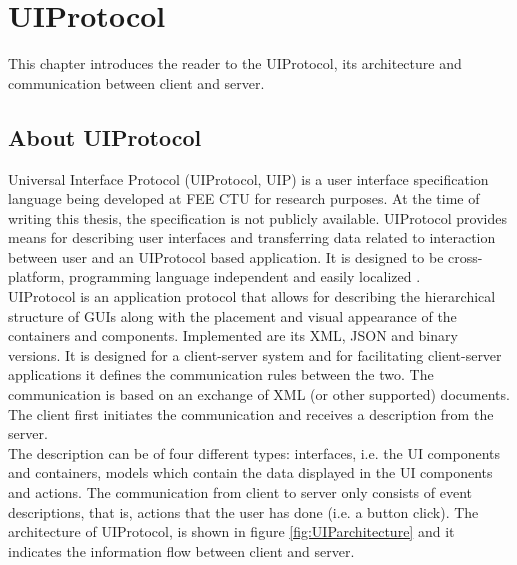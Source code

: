 \section{UIProtocol}
This chapter introduces the reader to the UIProtocol, its architecture and communication between client and server.


\subsection{About UIProtocol}
Universal Interface Protocol (UIProtocol, UIP) is a user interface specification language \cite{uip} being developed at FEE CTU for research purposes. At the time of writing this thesis, the specification is not publicly available. UIProtocol provides means for describing user interfaces and transferring data related to interaction between user and an UIProtocol based application. It is designed to be cross-platform, programming language independent and easily localized \cite{uip}.\\
UIProtocol is an application protocol that allows for describing the hierarchical structure of GUIs along with the placement and visual appearance of the containers and components. Implemented are its XML, JSON and binary versions. It is designed for a client-server system and for facilitating client-server applications it defines the communication rules between the two. The communication is based on an exchange of XML (or other supported) documents. The client first initiates the communication and receives a description from the server.\\The description can be of four different types: interfaces, i.e. the UI components and containers, models which contain the data displayed in the UI components and actions. The communication from client to server only consists of event descriptions, that is, actions that the user has done (i.e. a button click). The architecture of UIProtocol, is shown in figure \ref{fig:UIParchitecture} and it indicates the information flow between client and server.

